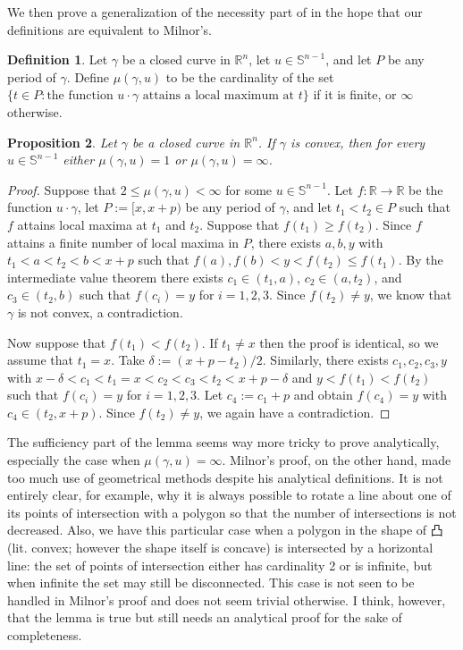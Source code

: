 \documentclass{amsart}
\newtheorem{proposition}{Proposition}[section]
\theoremstyle{definition}
\newtheorem{definition}[proposition]{Definition}
\theoremstyle{remark}
\begin{document}
We then prove a generalization of the necessity part
of \cite[Lemma 3.3]{milnor} in the hope that
our definitions are equivalent to Milnor's.

\begin{definition}
    Let $\gamma$ be a closed curve in $\mathbb{R}^n$,
    let $u\in\mathbb{S}^{n-1}$,
    and let $P$ be any period of $\gamma$.
    Define $\mu(\gamma,u)$ to be the cardinality of the set
    $\{t\in P:\text{the function }u\cdot\gamma
        \text{ attains a local maximum at }t\}$
    if it is finite, or $\infty$ otherwise.
\end{definition}

\begin{proposition}
    Let $\gamma$ be a closed curve in $\mathbb{R}^n$.
    If $\gamma$ is convex, then for every $u\in\mathbb{S}^{n-1}$
    either $\mu(\gamma,u)=1$ or $\mu(\gamma,u)=\infty$.
\end{proposition}

\begin{proof}
    Suppose that $2\le\mu(\gamma,u)<\infty$
    for some $u\in\mathbb{S}^{n-1}$.
    Let $f:\mathbb{R}\to\mathbb{R}$ be the function $u\cdot\gamma$,
    let $P:=[x,x+p)$ be any period of $\gamma$, and let $t_1<t_2\in P$
    such that $f$ attains local maxima at $t_1$ and $t_2$.
    Suppose that $f(t_1)\ge f(t_2)$.
    Since $f$ attains a finite number of local maxima in $P$,
    there exists $a,b,y$ with $t_1<a<t_2<b<x+p$ such that
    $f(a),f(b)<y<f(t_2)\le f(t_1)$.
    By the intermediate value theorem there exists
    $c_1\in(t_1,a)$, $c_2\in(a,t_2)$, and $c_3\in(t_2,b)$ such that
    $f(c_i)=y$ for $i=1,2,3$. Since $f(t_2)\ne y$, we know that
    $\gamma$ is not convex, a contradiction.

    Now suppose that $f(t_1)<f(t_2)$.
    If $t_1\ne x$ then the proof is identical,
    so we assume that $t_1=x$. Take $\delta:=(x+p-t_2)/2$.
    Similarly, there exists $c_1,c_2,c_3,y$ with
    $x-\delta<c_1<t_1=x<c_2<c_3<t_2<x+p-\delta$
    and $y<f(t_1)<f(t_2)$ such that
    $f(c_i)=y$ for $i=1,2,3$.
    Let $c_4:=c_1+p$ and obtain $f(c_4)=y$ with $c_4\in(t_2,x+p)$.
    Since $f(t_2)\ne y$, we again have a contradiction.
\end{proof}

The sufficiency part of the lemma seems way more tricky to prove
analytically, especially the case when $\mu(\gamma,u)=\infty$.
Milnor's proof, on the other hand, made too much use of
geometrical methods despite his analytical definitions.
It is not entirely clear, for example, why it is always possible
to rotate a line about one of its points of intersection with
a polygon so that the number of intersections is not decreased.
Also, we have this particular case when a polygon in the shape of 凸
(lit. convex; however the shape itself is concave)
is intersected by a horizontal line: the set of points of intersection
either has cardinality 2 or is infinite, but when infinite
the set may still be disconnected. This case is not seen to
be handled in Milnor's proof and does not seem trivial otherwise.
I think, however, that the lemma is true but still needs
an analytical proof for the sake of completeness.
\end{document}

